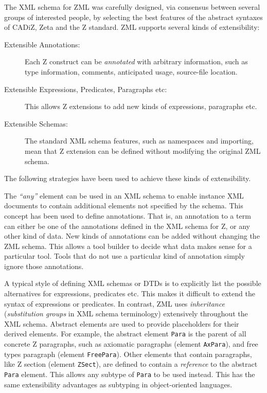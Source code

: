 \documentclass{llncs}
\newcommand{\Element}[1]{\texttt{#1}}
\begin{document}
  The XML schema for ZML was carefully designed, via consensus between
  several groups of interested people, by selecting the best features
  of the abstract syntaxes of CADiZ, Zeta and the Z standard.  
  ZML supports several kinds of extensibility:
  \begin{description}
  \item[Extensible Annotations:] Each Z construct can be \emph{annotated}
    with arbitrary information, such as type information, comments,
    anticipated usage, source-file location.
  \item[Extensible Expressions, Predicates, Paragraphs etc:] This
    allows Z extensions to add new kinds of expressions, paragraphs etc. 
  \item[Extensible Schemas:] The standard XML schema features, such as
    namespaces and importing, mean that Z extension can be defined without
    modifying the original ZML schema.
  \end{description}
  The following strategies have been used to achieve these kinds
  of extensibility.

  The \textit{``any''} element can be used in an XML schema to enable
  instance XML documents to contain additional elements not specified
  by the schema.  This concept has been used to define annotations.
  That is, an annotation to a term can either be one of the
  annotations defined in the XML schema for Z, or any other kind of
  data.  New kinds of annotations can be added without changing the ZML
  schema.  This allows a tool builder to decide what data makes sense
  for a particular tool.  Tools that do not use a particular kind
  of annotation simply ignore those annotations.

  A typical style of defining XML schemas or DTDs is to explicitly
  list the possible alternatives for expressions, predicates etc.
  This makes it difficult to extend the syntax of expressions or
  predicates.  In contrast, ZML uses \emph{inheritance}
  (\emph{substitution groups} in XML schema terminology) extensively
  throughout the XML schema.  Abstract elements are used to provide
  placeholders for their derived elements.  For example, the abstract
  element \Element{Para} is the parent of all concrete Z paragraphs,
  such as axiomatic paragraphs (element \Element{AxPara}), and free
  types paragraph (element \Element{FreePara}).  Other elements that
  contain paragraphs, like Z section (element \Element{ZSect}), are
  defined to contain a \emph{reference} to the abstract \Element{Para}
  element.  This allows any subtype of \Element{Para} to be used
  instead.  This has the same extensibility advantages as subtyping
  in object-oriented languages.
\end{document}
